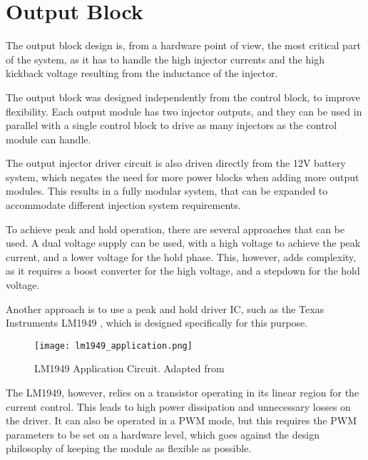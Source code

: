     \section{Output Block}

        The output block design is, from a hardware point of view, the most critical part of the system, as it has to handle the high injector currents and the high kickback voltage resulting from the inductance of the injector.

        The output block was designed independently from the control block, to improve flexibility. Each output module has two injector outputs, and they can be used in parallel with a single control block to drive as many injectors as the control module can handle. 
        
        The output injector driver circuit is also driven directly from the 12V battery system, which negates the need for more power blocks when adding more output modules. This results in a fully modular system, that can be expanded to accommodate different injection system requirements.

        To achieve peak and hold operation, there are several approaches that can be used. A dual voltage supply can be used, with a high voltage to achieve the peak current, and a lower voltage for the hold phase. This, however, adds complexity, as it requires a boost converter for the high voltage, and a stepdown for the hold voltage.

        Another approach is to use a peak and hold driver IC, such as the Texas Instruments LM1949 \autocite{texasinstrumentsLM1949InjectorDrive1995}, which is designed specifically for this purpose.


        \begin{figure}[H]
            \centering
            \texttt{[image: lm1949\_application.png]}
            \caption{LM1949 Application Circuit. Adapted from \autocite{texasinstrumentsLM1949InjectorDrive1995}}
            \label{fig:LM1949_application_circuit}
        \end{figure}

        The LM1949, however, relies on a transistor operating in its linear region for the current control. This leads to high power dissipation and unnecessary losses on the driver. It can also be operated in a PWM mode, but this requires the PWM parameters to be set on a hardware level, which goes against the design philosophy of keeping the module as flexible as possible.

